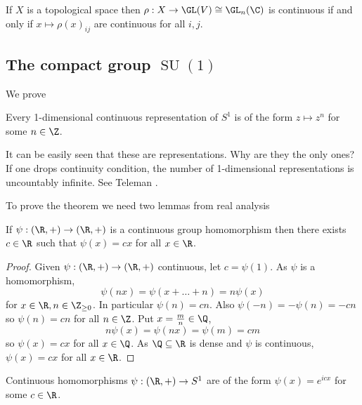 \documentclass[a4paper]{article}
\theoremstyle{definition}
\begin{document}
\begin{remark}
  If \(X\) is a topological space then \(\rho: X \to \GL(V) \cong \GL_n(\C)\) is continuous if and only if \(x \mapsto \rho(x)_{ij}\) are continuous for all \(i, j\).
\end{remark}

\subsection{The compact group \(\operatorname{SU}(1)\)}

We prove
\begin{theorem}
  \label{thm:representation of S1}
  Every 1-dimensional continuous representation of \(S^1\) is of the form \(z \mapsto z^n\) for some \(n \in \Z\).
\end{theorem}

\begin{remark}
  It can be easily seen that these are representations. Why are they the only ones? If one drops continuity condition, the number of 1-dimensional representations is uncountably infinite. See Teleman .
\end{remark}

To prove the theorem we need two lemmas from real analysis
\begin{lemma}
  If \(\psi: (\R, +) \to (\R, +)\) is a continuous group homomorphism then there exists \(c \in \R\) such that \(\psi(x) = cx\) for all \(x \in \R\).
\end{lemma}

\begin{proof}
  Given \(\psi: (\R, +) \to (\R, +)\) continuous, let \(c = \psi(1)\). As \(\psi\) is a homomorphism,
  \[
    \psi(nx) = \psi(x + \dots + n) = n \psi(x)
  \]
  for \(x \in \R, n \in \Z_{\geq 0}\). In particular \(\psi(n) = cn\). Also \(\psi(-n) = - \psi(n) = -cn\) so \(\psi(n) = cn\) for all \(n \in \Z\). Put \(x = \frac{m}{n} \in \Q\),
  \[
    n \psi(x) = \psi(nx) = \psi(m) = cm
  \]
  so \(\psi(x) = cx\) for all \(x \in \Q\). As \(\Q \subseteq \R\) is dense and \(\psi\) is continuous, \(\psi(x) = cx\) for all \(x \in \R\).
\end{proof}

\begin{lemma}
  Continuous homomorphisms \(\psi: (\R, +) \to S^1\) are of the form \(\psi(x) = e^{icx}\) for some \(c \in \R\).
\end{lemma}
\end{document}
